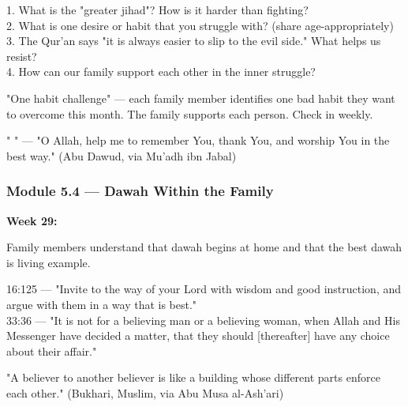 \documentclass[11pt,a4paper]{article}
\begin{document}
\begin{discussionbox} 1. What is the "greater jihad"? How is it harder than fighting? \\ 2. What is one desire or habit that you struggle with? (share age-appropriately) \\ 3. The Qur'an says "it is always easier to slip to the evil side." What helps us resist? \\ 4. How can our family support each other in the inner struggle? \end{discussionbox}

\begin{activitybox} "One habit challenge" --- each family member identifies one bad habit they want to overcome this month. The family supports each person. Check in weekly. \end{activitybox}

\begin{duabox} "      " --- "O Allah, help me to remember You, thank You, and worship You in the best way." (Abu Dawud, via Mu'adh ibn Jabal) \end{duabox}

\vspace{6pt}\noindent{\color{border}\rule{\textwidth}{0.5pt}}\vspace{6pt}

\subsubsection*{Module 5.4 --- Dawah Within the Family}
\textbf{Week 29:} 

\begin{outcomebox} Family members understand that dawah begins at home and that the best dawah is living example. \end{outcomebox}

\begin{quranbox} 16:125 --- "Invite to the way of your Lord with wisdom and good instruction, and argue with them in a way that is best." \\ 33:36 --- "It is not for a believing man or a believing woman, when Allah and His Messenger have decided a matter, that they should [thereafter] have any choice about their affair." \end{quranbox}

\begin{hadithbox} "A believer to another believer is like a building whose different parts enforce each other." (Bukhari, Muslim, via Abu Musa al-Ash'ari) \end{hadithbox}
\end{document}
